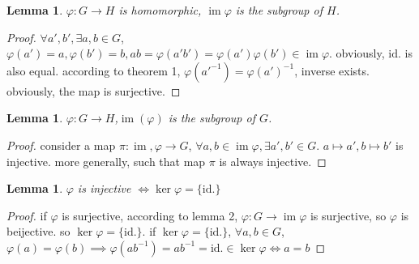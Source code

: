 \documentclass[10pt,a4paper]{article}
\newtheorem{lemma}[theorem]{Lemma}
\begin{document}
\begin{lemma}
    $\varphi:G\to H$ is homomorphic, $\operatorname{im}\varphi$ is the subgroup of $H$.
\end{lemma}
\begin{proof}
    $\forall a',b'\operatorname,\exists a,b\in G$, $\varphi(a')=a,\varphi(b')=b,ab=\varphi(a'b')=\varphi(a')\varphi(b')\in\operatorname{im}\varphi$. obviously, $\mathrm{id.}$ is also equal.
    according to theorem 1, $\varphi(a'^{-1})=\varphi(a')^{-1}$, inverse exists. obviously, the map is surjective.
\end{proof}
\begin{lemma}
    $\varphi:G\to H$,$\operatorname{im}(\varphi)$ is the subgroup of $G$.
\end{lemma}
\begin{proof}
   consider a map $\pi:\operatorname{im},\varphi\to G$, $\forall a,b\in\operatorname{im}\varphi,\exists a',b'\in G$. $a\mapsto a',b\mapsto b'$ is injective. more generally, such that map $\pi$ is always injective. 
\end{proof}
\begin{lemma}
    $\varphi$ is injective $\iff\ker\varphi=\{\mathrm{id.}\}$
\end{lemma}
\begin{proof}
    if $\varphi$ is surjective, according to lemma 2, $\varphi:G\to\operatorname{im}\varphi$ is surjective, so $\varphi$ is beijective.
    so $\ker\varphi=\{\mathrm{id.}\}$. if $\ker\varphi=\{\mathrm{id.}\}$, $\forall a,b\in G$, $\varphi(a)=\varphi(b)\implies\varphi(ab^{-1})=ab^{-1}=\mathrm{id.}\in\ker\varphi\iff a=b$
\end{proof}
\end{document}
